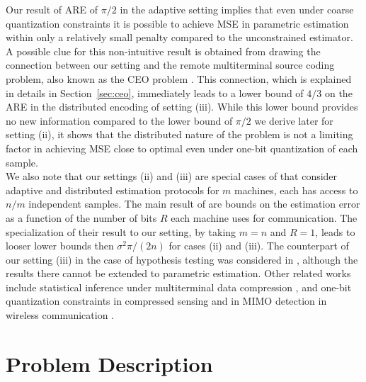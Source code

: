 \documentclass[letterpaper, conference]{IEEEtran}      %
\begin{document}
Our result of ARE of $\pi/2$ in the adaptive setting implies that even under coarse quantization constraints it is possible to achieve MSE in parametric estimation within only a relatively small penalty compared to the unconstrained estimator. A possible clue for this non-intuitive result is obtained from drawing the connection between our setting and the remote multiterminal source coding problem, also known as the CEO problem \cite{berger1996ceo, viswanathan1997quadratic, oohama1998rate, prabhakaran2004rate}. This connection, which is explained in details in Section~\ref{sec:ceo}, immediately leads to a lower bound of $4/3$ on the ARE in the distributed encoding of setting (iii). While this lower bound provides no new information compared to the lower bound of $\pi /2$ we derive later for setting (ii), it shows that the distributed nature of the problem is not a limiting factor in achieving MSE close to optimal even under one-bit quantization of each sample.\\

We also note that our settings (ii) and (iii) are special cases of 
\cite{zhang2013information} that consider adaptive and distributed estimation protocols for $m$ machines, each has access to $n/m$ independent samples. The main result of \cite{zhang2013information} are bounds on the estimation error as a function of the number of bits $R$ each machine uses for communication. The specialization of their result to our setting, by taking $m=n$ and $R=1$, leads to looser lower bounds then $\sigma^2\pi/(2n)$ for cases (ii) and (iii). The counterpart of our setting (iii) in the case of hypothesis testing was considered in \cite{52470}, although the results there cannot be extended to parametric estimation. Other related works include statistical inference under multiterminal data compression \cite{han1987hypothesis, zhang1988estimation}, and one-bit quantization constraints in compressed sensing  \cite{baraniuk2017exponential} and in MIMO detection in wireless communication \cite{singh2009limits}. \\


\section{Problem Description \label{sec:problem}}
\end{document}
